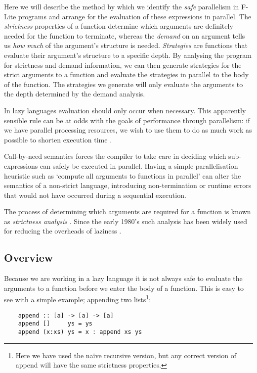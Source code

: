 Here we will describe the method by which we identify the \emph{safe}
parallelism in F-Lite programs and arrange for the evaluation of these
expressions in parallel. The \emph{strictness} properties of a function
determine which arguments are definitely needed for the function to terminate,
whereas the \emph{demand} on an argument tells us \emph{how much} of the
argument's structure is needed. \emph{Strategies} are functions that evaluate
their argument's structure to a specific depth. By analysing the program for
strictness and demand information, we can then generate strategies for the
strict arguments to a function and evaluate the strategies in parallel to the
body of the function. The strategies we generate will only evaluate the
arguments to the depth determined by the demand analysis.

In lazy languages evaluation should only occur when necessary. This apparently
sensible rule can be at odds with the goals of performance through parallelism:
if we have parallel processing resources, we wish to use them to do as much work
as possible to shorten execution time \citep{tremblay1995impact}.

Call-by-need semantics forces the compiler to take care in deciding which
sub-expressions can safely be executed in parallel.  Having a simple
parallelisation heuristic such as `compute all arguments to functions in
parallel' can alter the semantics of a non-strict language, introducing
non-termination or runtime errors that would not have occurred during a
sequential execution.


The process of determining which arguments are required for a function is known
as \emph{strictness analysis} \citep{mycroft1980theory}. Since the early 1980's
such analysis has been widely used for reducing the overheads of laziness
\citep{spjDemand}. 

\subsection{Overview}

Because we are working in a lazy language it is not always safe to evaluate the
arguments to a function before we enter the body of a function. This is easy
to see with a simple example; appending two lists\footnote{Here we have used
the na\"{i}ve recursive version, but any correct version of append will
have the same strictness properties.}:

\begin{verbatim}
    append :: [a] -> [a] -> [a]
    append []     ys = ys
    append (x:xs) ys = x : append xs ys
\end{verbatim}

